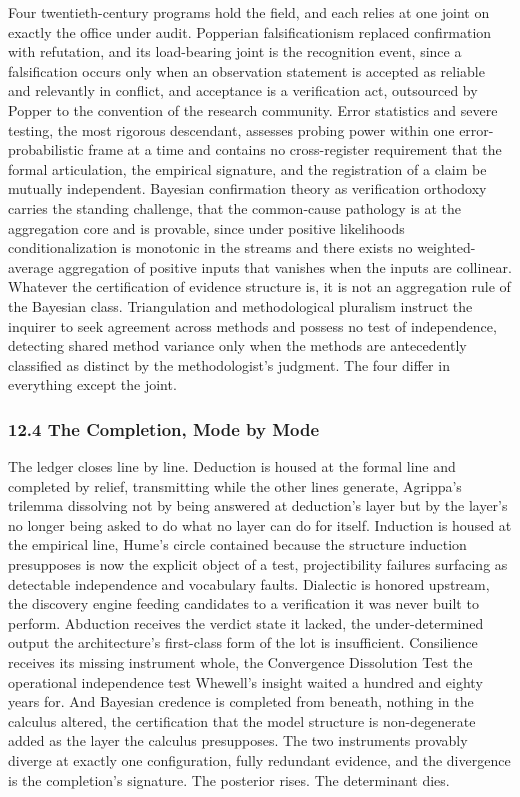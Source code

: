 \documentclass[10pt,twocolumn]{article}
\begin{document}
Four twentieth-century programs hold the field, and each relies at one
joint on exactly the office under audit. Popperian falsificationism
replaced confirmation with refutation, and its load-bearing joint is the
recognition event, since a falsification occurs only when an observation
statement is accepted as reliable and relevantly in conflict, and
acceptance is a verification act, outsourced by Popper to the convention
of the research community. Error statistics and severe testing, the most
rigorous descendant, assesses probing power within one
error-probabilistic frame at a time and contains no cross-register
requirement that the formal articulation, the empirical signature, and
the registration of a claim be mutually independent. Bayesian
confirmation theory as verification orthodoxy carries the standing
challenge, that the common-cause pathology is at the aggregation core
and is provable, since under positive likelihoods conditionalization is
monotonic in the streams and there exists no weighted-average
aggregation of positive inputs that vanishes when the inputs are
collinear. Whatever the certification of evidence structure is, it is
not an aggregation rule of the Bayesian class. Triangulation and
methodological pluralism instruct the inquirer to seek agreement across
methods and possess no test of independence, detecting shared method
variance only when the methods are antecedently classified as distinct
by the methodologist's judgment. The four differ in everything except
the joint.

\hypertarget{the-completion-mode-by-mode}{%
\subsubsection{12.4 The Completion, Mode by
Mode}\label{the-completion-mode-by-mode}}

The ledger closes line by line. Deduction is housed at the formal line
and completed by relief, transmitting while the other lines generate,
Agrippa's trilemma dissolving not by being answered at deduction's layer
but by the layer's no longer being asked to do what no layer can do for
itself. Induction is housed at the empirical line, Hume's circle
contained because the structure induction presupposes is now the
explicit object of a test, projectibility failures surfacing as
detectable independence and vocabulary faults. Dialectic is honored
upstream, the discovery engine feeding candidates to a verification it
was never built to perform. Abduction receives the verdict state it
lacked, the under-determined output the architecture's first-class form
of the lot is insufficient. Consilience receives its missing instrument
whole, the Convergence Dissolution Test the operational independence
test Whewell's insight waited a hundred and eighty years for. And
Bayesian credence is completed from beneath, nothing in the calculus
altered, the certification that the model structure is non-degenerate
added as the layer the calculus presupposes. The two instruments
provably diverge at exactly one configuration, fully redundant evidence,
and the divergence is the completion's signature. The posterior rises.
The determinant dies.
\end{document}
